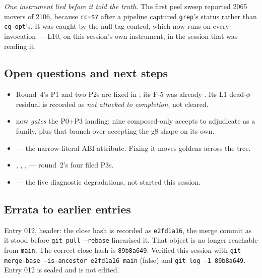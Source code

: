\emph{One instrument lied before it told the truth.} The first peel sweep reported 2065 movers of
2106, because \texttt{rc=\$?} after a pipeline captured \texttt{grep}'s status rather than
\texttt{cq-opt}'s. It was caught by the null-tag control, which now runs on every invocation ---
 L10, on this session's own instrument, in the session that was reading it.

\subsection*{Open questions and next steps}
\begin{itemize}
  \item Round~4's P1 and two P2s are fixed in ; its F-5 was already . Its L1 dead-$\phi$ residual is recorded as \emph{not attacked to completion}, not cleared.
  \item {} now \emph{gates} the  P0+P3 landing: nine composed-only accepts to
        adjudicate as a family, plus that branch over-accepting the  g8 shape on its own.
  \item {} --- the narrow-literal ABI attribute. Fixing it moves goldens across the tree.
  \item {}, , ,  --- round~2's four filed P3s.
  \item {} --- the five diagnostic degradations, not started this session.
\end{itemize}

\subsection*{Errata to earlier entries}
Entry 012, header: the close hash is recorded as \texttt{e2fd1a16}, the merge commit as it stood
before \texttt{git pull --rebase} linearised it. That object is no longer reachable from
\texttt{main}. The correct close hash is \texttt{89b8a649}. Verified this session with
\texttt{git merge-base --is-ancestor e2fd1a16 main} (false) and \texttt{git log -1 89b8a649}.
Entry 012 is sealed and is not edited.
